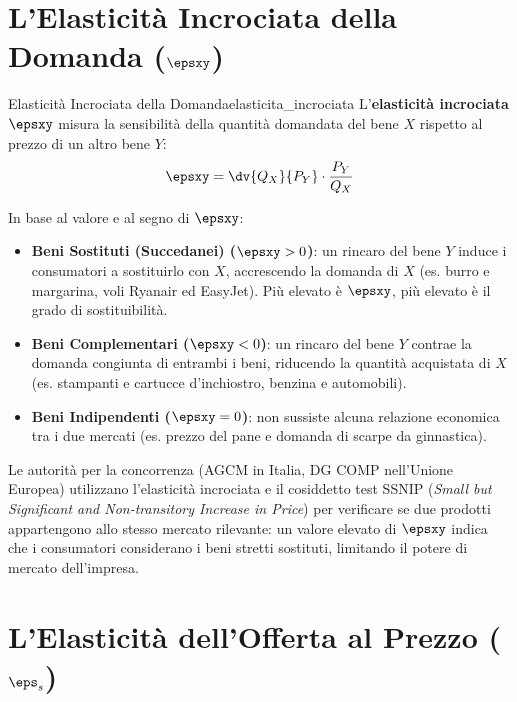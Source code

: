 \section{L'Elasticità Incrociata della Domanda ($\epsxy$)}

\begin{definizione}{Elasticità Incrociata della Domanda}{elasticita_incrociata}
L'\textbf{elasticità incrociata} $\epsxy$ misura la sensibilità della quantità domandata del bene $X$ rispetto al prezzo di un altro bene $Y$:
\begin{equation}
    \epsxy = \dv{Q_X}{P_Y} \cdot \frac{P_Y}{Q_X}
\end{equation}
\end{definizione}

In base al valore e al segno di $\epsxy$:
\begin{itemize}
    \item \textbf{Beni Sostituti (Succedanei) ($\epsxy > 0$)}: un rincaro del bene $Y$ induce i consumatori a sostituirlo con $X$, accrescendo la domanda di $X$ (es. burro e margarina, voli Ryanair ed EasyJet). Più elevato è $\epsxy$, più elevato è il grado di sostituibilità.
    \item \textbf{Beni Complementari ($\epsxy < 0$)}: un rincaro del bene $Y$ contrae la domanda congiunta di entrambi i beni, riducendo la quantità acquistata di $X$ (es. stampanti e cartucce d'inchiostro, benzina e automobili).
    \item \textbf{Beni Indipendenti ($\epsxy = 0$)}: non sussiste alcuna relazione economica tra i due mercati (es. prezzo del pane e domanda di scarpe da ginnastica).
\end{itemize}

\begin{osservazione}
Le autorità per la concorrenza (AGCM in Italia, DG COMP nell'Unione Europea) utilizzano l'elasticità incrociata e il cosiddetto test SSNIP (\textit{Small but Significant and Non-transitory Increase in Price}) per verificare se due prodotti appartengono allo stesso mercato rilevante: un valore elevato di $\epsxy$ indica che i consumatori considerano i beni stretti sostituti, limitando il potere di mercato dell'impresa.
\end{osservazione}

\section{L'Elasticità dell'Offerta al Prezzo ($\eps_s$)}

